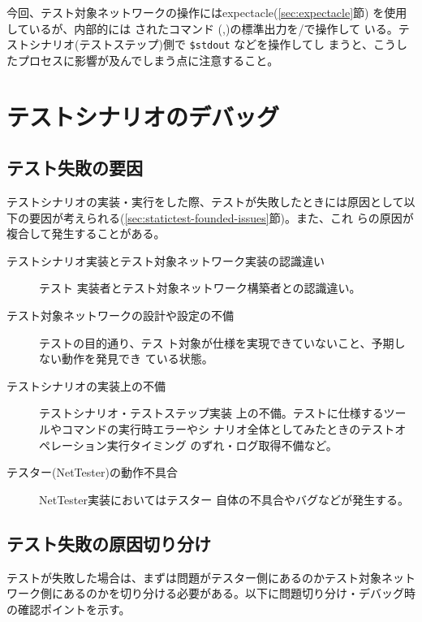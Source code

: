 今回、テスト対象ネットワークの操作にはexpectacle(\ref{sec:expectacle}節)
を使用しているが、内部的には  されたコマンド
(,)の標準出力を/で操作して
いる。テストシナリオ(テストステップ)側で \verb|$stdout| などを操作してし
まうと、こうしたプロセスに影響が及んでしまう点に注意すること。

 \section{テストシナリオのデバッグ}

  \subsection{テスト失敗の要因}
テストシナリオの実装・実行をした際、テストが失敗したときには原因として以
下の要因が考えられる(\ref{sec:statictest-founded-issues}節)。また、これ
らの原因が複合して発生することがある。
\begin{description}
 \item[テストシナリオ実装とテスト対象ネットワーク実装の認識違い] テスト
            実装者とテスト対象ネットワーク構築者との認識違い。
 \item[テスト対象ネットワークの設計や設定の不備] テストの目的通り、テス
            ト対象が仕様を実現できていないこと、予期しない動作を発見でき
            ている状態。
 \item[テストシナリオの実装上の不備] テストシナリオ・テストステップ実装
            上の不備。テストに仕様するツールやコマンドの実行時エラーやシ
            ナリオ全体としてみたときのテストオペレーション実行タイミング
            のずれ・ログ取得不備など。
 \item[テスター(NetTester)の動作不具合] NetTester実装においてはテスター
            自体の不具合やバグなどが発生する。
\end{description}

  \subsection{テスト失敗の原因切り分け}

テストが失敗した場合は、まずは問題がテスター側にあるのかテスト対象ネット
ワーク側にあるのかを切り分ける必要がある。以下に問題切り分け・デバッグ時
の確認ポイントを示す。

